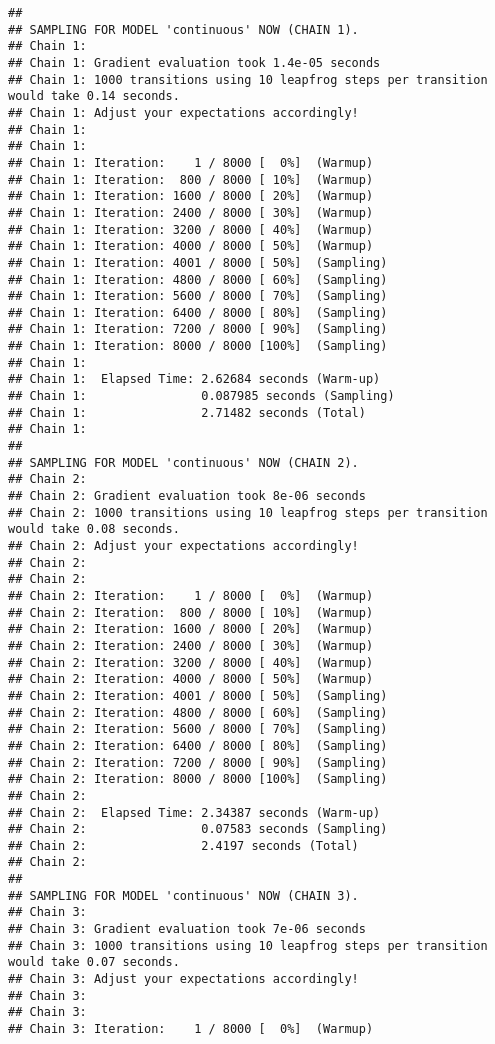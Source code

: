 \documentclass[
]{article}
\begin{document}
\begin{verbatim}
## 
## SAMPLING FOR MODEL 'continuous' NOW (CHAIN 1).
## Chain 1: 
## Chain 1: Gradient evaluation took 1.4e-05 seconds
## Chain 1: 1000 transitions using 10 leapfrog steps per transition would take 0.14 seconds.
## Chain 1: Adjust your expectations accordingly!
## Chain 1: 
## Chain 1: 
## Chain 1: Iteration:    1 / 8000 [  0%]  (Warmup)
## Chain 1: Iteration:  800 / 8000 [ 10%]  (Warmup)
## Chain 1: Iteration: 1600 / 8000 [ 20%]  (Warmup)
## Chain 1: Iteration: 2400 / 8000 [ 30%]  (Warmup)
## Chain 1: Iteration: 3200 / 8000 [ 40%]  (Warmup)
## Chain 1: Iteration: 4000 / 8000 [ 50%]  (Warmup)
## Chain 1: Iteration: 4001 / 8000 [ 50%]  (Sampling)
## Chain 1: Iteration: 4800 / 8000 [ 60%]  (Sampling)
## Chain 1: Iteration: 5600 / 8000 [ 70%]  (Sampling)
## Chain 1: Iteration: 6400 / 8000 [ 80%]  (Sampling)
## Chain 1: Iteration: 7200 / 8000 [ 90%]  (Sampling)
## Chain 1: Iteration: 8000 / 8000 [100%]  (Sampling)
## Chain 1: 
## Chain 1:  Elapsed Time: 2.62684 seconds (Warm-up)
## Chain 1:                0.087985 seconds (Sampling)
## Chain 1:                2.71482 seconds (Total)
## Chain 1: 
## 
## SAMPLING FOR MODEL 'continuous' NOW (CHAIN 2).
## Chain 2: 
## Chain 2: Gradient evaluation took 8e-06 seconds
## Chain 2: 1000 transitions using 10 leapfrog steps per transition would take 0.08 seconds.
## Chain 2: Adjust your expectations accordingly!
## Chain 2: 
## Chain 2: 
## Chain 2: Iteration:    1 / 8000 [  0%]  (Warmup)
## Chain 2: Iteration:  800 / 8000 [ 10%]  (Warmup)
## Chain 2: Iteration: 1600 / 8000 [ 20%]  (Warmup)
## Chain 2: Iteration: 2400 / 8000 [ 30%]  (Warmup)
## Chain 2: Iteration: 3200 / 8000 [ 40%]  (Warmup)
## Chain 2: Iteration: 4000 / 8000 [ 50%]  (Warmup)
## Chain 2: Iteration: 4001 / 8000 [ 50%]  (Sampling)
## Chain 2: Iteration: 4800 / 8000 [ 60%]  (Sampling)
## Chain 2: Iteration: 5600 / 8000 [ 70%]  (Sampling)
## Chain 2: Iteration: 6400 / 8000 [ 80%]  (Sampling)
## Chain 2: Iteration: 7200 / 8000 [ 90%]  (Sampling)
## Chain 2: Iteration: 8000 / 8000 [100%]  (Sampling)
## Chain 2: 
## Chain 2:  Elapsed Time: 2.34387 seconds (Warm-up)
## Chain 2:                0.07583 seconds (Sampling)
## Chain 2:                2.4197 seconds (Total)
## Chain 2: 
## 
## SAMPLING FOR MODEL 'continuous' NOW (CHAIN 3).
## Chain 3: 
## Chain 3: Gradient evaluation took 7e-06 seconds
## Chain 3: 1000 transitions using 10 leapfrog steps per transition would take 0.07 seconds.
## Chain 3: Adjust your expectations accordingly!
## Chain 3: 
## Chain 3: 
## Chain 3: Iteration:    1 / 8000 [  0%]  (Warmup)

\end{verbatim}
\end{document}
